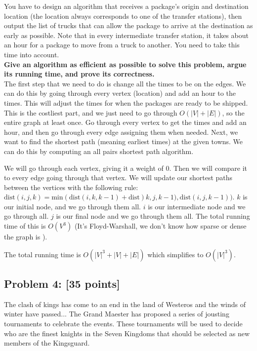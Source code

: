 \documentclass[11pt]{article}
\begin{document}
\noindent You have to design an algorithm that receives a package's
origin and destination location (the location always corresponds to
one of the transfer stations), then output the list of trucks that can
allow the package to arrive at the destination as early as
possible. Note that in every intermediate transfer station, it takes
about an hour for a package to move from a truck to another. You need
to take this time into account.\\

\noindent \textbf{Give an algorithm as efficient as possible to solve this
problem, argue its running time, and prove its correctness.}\\

The first step that we need to do is change all the times to be on the edges. We can do this by going through every vertex (location) and add an hour to the times. This will adjust the times for when the packages are ready to be shipped. This is the costliest part, and we just need to go through $O(|V| + |E|)$, so the entire graph at least once. Go through every vertex to get the times and add an hour, and then go through every edge assigning them when needed. Next, we want to find the shortest path (meaning earliest times) at the given towns. We can do this by computing an all pairs shortest path algorithm.

We will go through each vertex, giving it a weight of 0. Then we will compare it to every edge going through that vertex. We will update our shortest paths between the  vertices with the following rule: $\text{dist}(i,j,k) = \text{min}(\text{dist}(i,k,k-1)+\text{dist})k,j,k-1),\text{dist}(i,j,k-1))$. $k$ is our initial node, and we go through them all. $i$ is our intermediate node and we go through all. $j$ is our final node and we go through them all. The total running time of this is $O(V^3)$ (It's Floyd-Warshall, we don't know how sparse or dense the graph is ).

The total running time is $O(|V|^3 + |V| + |E|)$ which simplifies to $O(|V|^3)$.

\subsection*{Problem 4: [35 points]} The clash of kings has come to an end in
the land of Westeros and the winds of winter have passed... The Grand
Maester has proposed a series of jousting tournaments to celebrate the
events. These tournaments will be used to decide who are the finest
knights in the Seven Kingdoms that should be selected as new members
of the Kingsguard.\\
\end{document}
